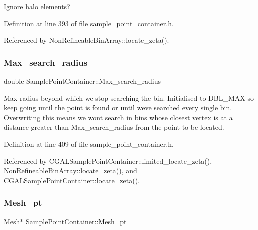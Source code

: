 Ignore halo elements? 



Definition at line 393 of file sample\+\_\+point\+\_\+container.\+h.



Referenced by Non\+Refineable\+Bin\+Array\+::locate\+\_\+zeta().

\mbox{\label{classSamplePointContainer_aae6e7df15b2dbbdf18467716da817f22}} 
\subsubsection{\texorpdfstring{Max\+\_\+search\+\_\+radius}{Max\_search\_radius}}
{\footnotesize\ttfamily double Sample\+Point\+Container\+::\+Max\+\_\+search\+\_\+radius\hspace{0.3cm}{\ttfamily [protected]}}



Max radius beyond which we stop searching the bin. Initialised to D\+B\+L\+\_\+\+M\+AX so keep going until the point is found or until we\textquotesingle{}ve searched every single bin. Overwriting this means we won\textquotesingle{}t search in bins whose closest vertex is at a distance greater than Max\+\_\+search\+\_\+radius from the point to be located. 



Definition at line 409 of file sample\+\_\+point\+\_\+container.\+h.



Referenced by C\+G\+A\+L\+Sample\+Point\+Container\+::limited\+\_\+locate\+\_\+zeta(), Non\+Refineable\+Bin\+Array\+::locate\+\_\+zeta(), and C\+G\+A\+L\+Sample\+Point\+Container\+::locate\+\_\+zeta().

\mbox{\label{classSamplePointContainer_a9f044cf51ea29b0a1a85e029defd81d5}} 
\subsubsection{\texorpdfstring{Mesh\+\_\+pt}{Mesh\_pt}}
{\footnotesize\ttfamily Mesh$\ast$ Sample\+Point\+Container\+::\+Mesh\+\_\+pt\hspace{0.3cm}{\ttfamily [protected]}}



